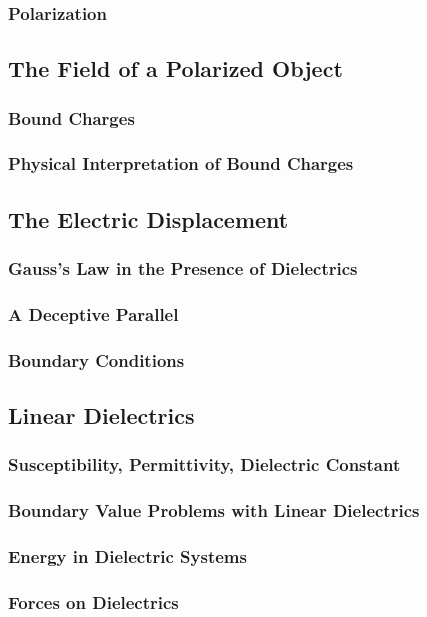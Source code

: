 \documentclass{article}
\begin{document}
\subsubsection{Polarization}

\subsection{The Field of a Polarized Object}
\subsubsection{Bound Charges}
\subsubsection{Physical Interpretation of Bound Charges}

\subsection{The Electric Displacement}
\subsubsection{Gauss's Law in the Presence of Dielectrics}
\subsubsection{A Deceptive Parallel}
\subsubsection{Boundary Conditions}

\subsection{Linear Dielectrics}
\subsubsection{Susceptibility, Permittivity, Dielectric Constant}
\subsubsection{Boundary Value Problems with Linear Dielectrics}
\subsubsection{Energy in Dielectric Systems}
\subsubsection{Forces on Dielectrics}
\end{document}
